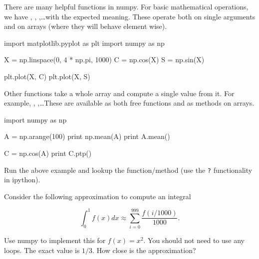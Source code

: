 There are many helpful functions in numpy. For basic mathematical operations, we have , ,
,\ldots with the expected meaning. These operate both on single
arguments and on arrays (where they will behave element wise).

\begin{python}
import matplotlib.pyplot as plt
import numpy as np

X = np.linspace(0, 4 * np.pi, 1000)
C = np.cos(X)
S = np.sin(X)

plt.plot(X, C)
plt.plot(X, S)
\end{python}

Other functions take a whole array and compute a single value from it. For
example, , ,\ldots These are available as both free
functions and as methods on arrays.

\begin{python}
import numpy as np

A = np.arange(100)
print np.mean(A)
print A.mean()

C = np.cos(A)
print C.ptp()
\end{python}

\begin{exercise}
Run the above example and lookup the  function/method (use the \texttt{?} functionality in ipython).
\end{exercise}


\begin{exercise}
Consider the following approximation to compute an integral

\[
\int_0^{1} f(x)dx \approx \sum_{i = 0}^{999} \frac{f(i/1000)}{1000}.
\]

Use numpy to implement this for $f(x) = x^2$. You should not need to use any
loops. The exact value is $1/3$. How close is the approximation?
\end{exercise}



